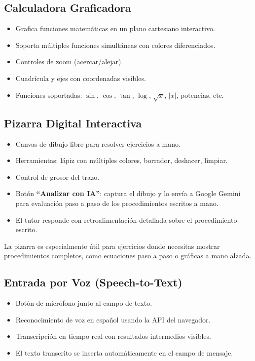 \documentclass[12pt, a4paper, oneside]{book}
\begin{document}
\subsection{Calculadora Graficadora}

\begin{itemize}
    \item Grafica funciones matemáticas en un plano cartesiano interactivo.
    \item Soporta múltiples funciones simultáneas con colores diferenciados.
    \item Controles de zoom (acercar/alejar).
    \item Cuadrícula y ejes con coordenadas visibles.
    \item Funciones soportadas: $\sin$, $\cos$, $\tan$, $\log$, $\sqrt{x}$, $|x|$, potencias, etc.
\end{itemize}

\subsection{Pizarra Digital Interactiva}

\begin{itemize}
    \item Canvas de dibujo libre para resolver ejercicios a mano.
    \item Herramientas: lápiz con múltiples colores, borrador, deshacer, limpiar.
    \item Control de grosor del trazo.
    \item Botón \textbf{``Analizar con IA''}: captura el dibujo y lo envía a Google Gemini para evaluación paso a paso de los procedimientos escritos a mano.
    \item El tutor responde con retroalimentación detallada sobre el procedimiento escrito.
\end{itemize}

\begin{notabox}
    La pizarra es especialmente útil para ejercicios donde necesitas mostrar procedimientos completos, como ecuaciones paso a paso o gráficas a mano alzada.
\end{notabox}

\subsection{Entrada por Voz (Speech-to-Text)}

\begin{itemize}
    \item Botón de micrófono junto al campo de texto.
    \item Reconocimiento de voz en español usando la API del navegador.
    \item Transcripción en tiempo real con resultados intermedios visibles.
    \item El texto transcrito se inserta automáticamente en el campo de mensaje.
\end{itemize}
\end{document}
